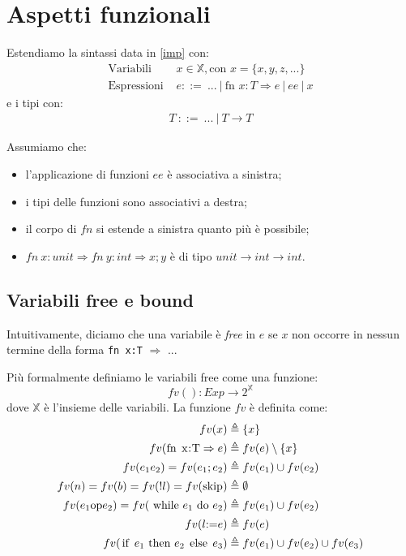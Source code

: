 \documentclass[a4paper, 11pt]{article}
\newcommand{\code}[1]{\textup{\lstinline{#1}}}
\begin{document}
\section{Aspetti funzionali}
Estendiamo la sintassi data in \ref{imp} con:	 \begin{align*}
	\text{Variabili } &x \in \mathbb{X}, \text{con } x = \lbrace x,y,z,...\rbrace \\
	\text{Espressioni }&e::=\ ...\ |\ \text{fn }x:T \Rightarrow e\ |\ ee\ |\ x
\end{align*}
e i tipi con: \begin{align*}
	T\ ::=\ ...\ |\ T \to T
\end{align*}

Assumiamo che: \begin{itemize}
	\item l'applicazione di funzioni $ee$ è associativa a sinistra;
	\item i tipi delle funzioni sono associativi a destra;
	\item il corpo di $fn$ si estende a sinistra quanto più è possibile;
	\item $fn\ x:unit \Rightarrow fn\ y:int \Rightarrow x;y$ è di tipo $unit \to int \to int$.
\end{itemize}

\subsection{Variabili free e bound}
Intuitivamente, diciamo che una variabile è \textit{free} in $e$ se $x$ non occorre in nessun termine della forma \lstinline|fn x:T| $\Rightarrow$ ...

Più formalmente definiamo le variabili free come una funzione: \[ fv(): Exp \to 2^\mathbb{X} \] dove $\mathbb{X}$ è l'insieme delle variabili. La funzione $fv$ è definita come: \begin{align*}
	fv(x) &\triangleq \lbrace x \rbrace \\
	fv(\code{fn x:T} \Rightarrow e) &\triangleq fv(e) \setminus \lbrace x \rbrace \\
	fv(e_1 e_2)= fv (e_1;e_2) &\triangleq fv(e_1) \cup fv(e_2) \\
	fv(n)=fv(b)=fv(!l)=fv(\code{skip}) &\triangleq \emptyset \\
	fv(e_1 \code{op} e_2) = fv(\ \code{while}\ e_1\ \code{do}\ e_2) &\triangleq fv(e_1) \cup fv(e_2) \\
	fv(l \code{:=} e) &\triangleq fv(e) \\
	fv(\code{if}\ e_1\ \code{then}\ e_2\ \code{else}\ e_3) &\triangleq fv(e_1) \cup fv(e_2) \cup fv(e_3)
\end{align*}
\end{document}
